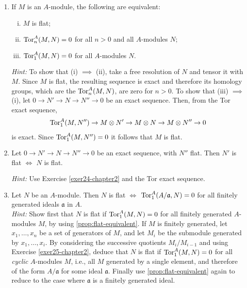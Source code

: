 \begin{enumerate}
    \emph{Flatness and Tor.} 

    In these Exercises it will be assumed that the reader is familiar with the definition and basic properties of the Tor functor.

    \item \label{exer24-chapter2}If $M$ is an $A$-module, the following are equivalent:
    \begin{enumerate}[i)]
        \item $M$ is flat;
        \item $\operatorname{Tor}_n^A(M, N) = 0$ for all $n > 0$ and all $A$-modules $N$;
        \item $\operatorname{Tor}_1^A(M, N) = 0$ for all $A$-modules $N$.
    \end{enumerate}
    \textit{Hint:} To show that (i) $\implies$ (ii), take a free resolution of $N$ and tensor it with $M$. Since $M$ is flat, the resulting sequence is exact and therefore its homology groups, which are the $\operatorname{Tor}_n^A(M, N)$, are zero for $n > 0$. To show that (iii) $\implies$ (i), let $0 \to N' \to N \to N'' \to 0$ be an exact sequence. Then, from the Tor exact sequence,
    \[
    \operatorname{Tor}_1^A(M, N'') \to M \otimes N' \to M \otimes N \to M \otimes N'' \to 0
    \]
    is exact. Since $\operatorname{Tor}_1^A(M, N'') = 0$ it follows that $M$ is flat.

    \item \label{exer25-chapter2}Let $0 \to N' \to N \to N'' \to 0$ be an exact sequence, with $N''$ flat. Then $N'$ is flat $\iff$ $N$ is flat.

    \textit{Hint:} Use Exercise \ref{exer24-chapter2} and the Tor exact sequence.

    \item \label{exer26-chapter2}Let $N$ be an $A$-module. Then $N$ is flat $\iff$ $\operatorname{Tor}_1^A(A/\mathfrak{a}, N) = 0$ for all finitely generated ideals $\mathfrak{a}$ in $A$.\\
    \textit{Hint:} Show first that $N$ is flat if $\operatorname{Tor}_1^A(M, N) = 0$ for all finitely generated $A$-modules $M$, by using \eqref{prop:flat-equivalent}. If $M$ is finitely generated, let $x_1, \ldots, x_n$ be a set of generators of $M$, and let $M_i$ be the submodule generated by $x_1, \ldots, x_i$. By considering the successive quotients $M_i/M_{i-1}$ and using Exercise \ref{exer25-chapter2}, deduce that $N$ is flat if $\operatorname{Tor}_1^A(M, N) = 0$ for all \emph{cyclic} $A$-modules $M$, i.e., all $M$ generated by a single element, and therefore of the form $A/\mathfrak{a}$ for some ideal $\mathfrak{a}$. Finally use \eqref{prop:flat-equivalent} again to reduce to the case where $\mathfrak{a}$ is a finitely generated ideal.


\end{enumerate}
